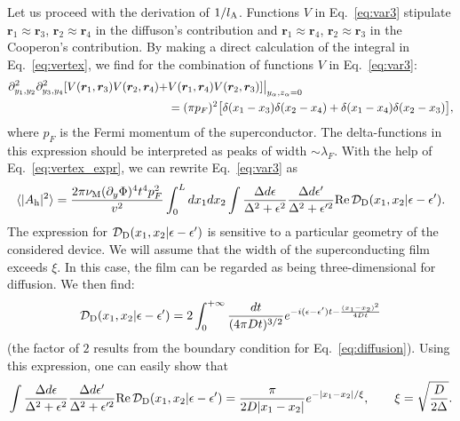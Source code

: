 \documentclass[pra,aps,a4paper,twocolumn,superscriptaddress,longbibliography]{revtex4-2}
\newcommand{\difz}{{\cal D}_{\rm D}}
\newcommand{\lprox}{L}
\newcommand{\lA}{l_{\rm A}}
\newcommand{\he}{A_{\rm h}}
\newcommand{\xic}{\xi}
\begin{document}
Let us proceed with the derivation of $1/\lA$. Functions $V$ in Eq.~\eqref{eq:var3} stipulate ${\bm r}_1 \approx {\bm r}_3$, ${\bm r}_2 \approx {\bm r}_4$ in the diffuson's contribution and ${\bm r}_1 \approx {\bm r}_4$, ${\bm r}_2 \approx {\bm r}_3$ in the Cooperon's contribution. By making a direct calculation of the integral in Eq.~\eqref{eq:vertex}, we find for the combination of functions $V$ in Eq.~\eqref{eq:var3}:
\begin{align}\label{eq:vertex_expr}
    \partial^2_{y_1,y_2}\partial^2_{y_3, y_4}[V({\bm r}_1, {\bm r}_3)V({\bm r}_2, {\bm r}_4) + & V({\bm r}_1, {\bm r}_4)V({\bm r}_2, {\bm r}_3)]\big|_{y_\alpha, z_\alpha = 0}\notag\\
    &= (\pi p_F)^2 \big[\delta(x_1 -x_3) \delta(x_2-x_4) + \delta(x_1 -x_4)\delta(x_2-x_3)\big],
\end{align}
where $p_F$ is the Fermi momentum of the superconductor. The delta-functions in this expression should be interpreted as peaks of width $\sim \lambda_F$. With the help of Eq.~\eqref{eq:vertex_expr}, we can rewrite Eq.~\eqref{eq:var3} as
\begin{align}\label{eq:var4}
   \langle |\he|^2 \rangle = \frac{2\pi \nu_{\rm M}(\partial_y \Phi)^4 t^4 p_F^2}{v^2} \int_0^\lprox dx_{1}dx_{2}\int \frac{\Delta d\epsilon}{\Delta^2 +\epsilon^2} \frac{\Delta d\epsilon^\prime}{\Delta^2+\epsilon^{\prime 2}}
   {\rm Re}\,{\difz}(x_1,x_2|\epsilon - \epsilon^\prime).
\end{align}
The expression for ${\difz}(x_1,x_2|\epsilon - \epsilon^\prime)$ is sensitive to a particular geometry of the considered device. We will assume that the width of the superconducting film exceeds $\xic$. In this case, the film can be regarded as being three-dimensional for diffusion. We then find:
\begin{equation}\label{eq:diffuson_expl}
    {\difz}(x_1,x_2|\epsilon - \epsilon^\prime) = 2 \int_0^{+\infty}\frac{dt }{(4\pi D t)^{3/2}}e^{-i(\epsilon - \epsilon^\prime)t - \frac{(x_1 - x_2)^2}{4Dt}}
\end{equation}
(the factor of $2$ results from the boundary condition for Eq.~\eqref{eq:diffusion}).
Using this expression, one can easily show that
\begin{equation}\label{eq:diff_int}
    \int \frac{\Delta d\epsilon}{\Delta^2 +\epsilon^2} \frac{\Delta d\epsilon^\prime}{\Delta^2+\epsilon^{\prime 2}}
   {\rm Re}\,{\difz}(x_1,x_2|\epsilon - \epsilon^\prime) = \frac{\pi}{2D|x_{1}-x_{2}|}e^{-|x_{1}-x_{2}|/\xic},\quad\quad \xic = \sqrt{\frac{D}{2\Delta}}.
\end{equation}
\end{document}
